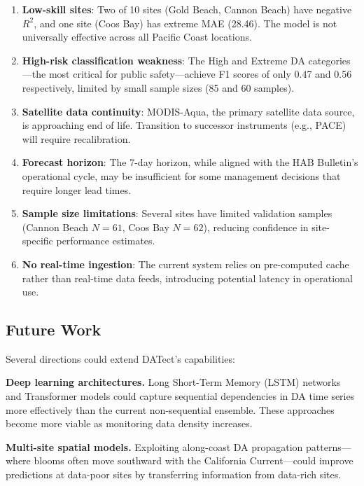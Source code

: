 \documentclass[preprint,12pt,authoryear]{elsarticle}
\begin{document}
\begin{enumerate}[nosep]
    \item \textbf{Low-skill sites}: Two of 10 sites (Gold Beach, Cannon Beach) have negative $R^2$, and one site (Coos Bay) has extreme MAE (\SI{28.46}{\microgrampeg}). The model is not universally effective across all Pacific Coast locations.
    \item \textbf{High-risk classification weakness}: The High and Extreme DA categories---the most critical for public safety---achieve F1 scores of only 0.47 and 0.56 respectively, limited by small sample sizes (85 and 60 samples).
    \item \textbf{Satellite data continuity}: MODIS-Aqua, the primary satellite data source, is approaching end of life. Transition to successor instruments (e.g., PACE) will require recalibration.
    \item \textbf{Forecast horizon}: The 7-day horizon, while aligned with the HAB Bulletin's operational cycle, may be insufficient for some management decisions that require longer lead times.
    \item \textbf{Sample size limitations}: Several sites have limited validation samples (Cannon Beach $N = 61$, Coos Bay $N = 62$), reducing confidence in site-specific performance estimates.
    \item \textbf{No real-time ingestion}: The current system relies on pre-computed cache rather than real-time data feeds, introducing potential latency in operational use.
\end{enumerate}

\subsection{Future Work}
\label{sec:discussion-future}

Several directions could extend DATect's capabilities:

\textbf{Deep learning architectures.} Long Short-Term Memory (LSTM) networks \citep{Hochreiter1997} and Transformer models \citep{Vaswani2017} could capture sequential dependencies in DA time series more effectively than the current non-sequential ensemble. These approaches become more viable as monitoring data density increases.

\textbf{Multi-site spatial models.} Exploiting along-coast DA propagation patterns---where blooms often move southward with the California Current---could improve predictions at data-poor sites by transferring information from data-rich sites.
\end{document}
